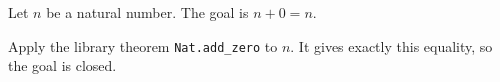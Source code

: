 Let $n$ be a natural number. The goal is $n+0=n$.

Apply the library theorem \texttt{Nat.add_zero} to $n$. It gives exactly this equality, so the goal is closed.
